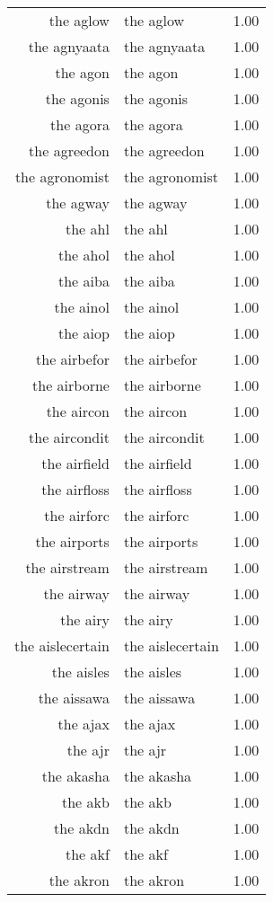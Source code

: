 \begin{table}[ht]
\begin{tabular}{rlr}
  the aglow & the aglow & 1.00 \\ 
  the agnyaata & the agnyaata & 1.00 \\ 
  the agon & the agon & 1.00 \\ 
  the agonis & the agonis & 1.00 \\ 
  the agora & the agora & 1.00 \\ 
  the agreedon & the agreedon & 1.00 \\ 
  the agronomist & the agronomist & 1.00 \\ 
  the agway & the agway & 1.00 \\ 
  the ahl & the ahl & 1.00 \\ 
  the ahol & the ahol & 1.00 \\ 
  the aiba & the aiba & 1.00 \\ 
  the ainol & the ainol & 1.00 \\ 
  the aiop & the aiop & 1.00 \\ 
  the airbefor & the airbefor & 1.00 \\ 
  the airborne & the airborne & 1.00 \\ 
  the aircon & the aircon & 1.00 \\ 
  the aircondit & the aircondit & 1.00 \\ 
  the airfield & the airfield & 1.00 \\ 
  the airfloss & the airfloss & 1.00 \\ 
  the airforc & the airforc & 1.00 \\ 
  the airports & the airports & 1.00 \\ 
  the airstream & the airstream & 1.00 \\ 
  the airway & the airway & 1.00 \\ 
  the airy & the airy & 1.00 \\ 
  the aislecertain & the aislecertain & 1.00 \\ 
  the aisles & the aisles & 1.00 \\ 
  the aissawa & the aissawa & 1.00 \\ 
  the ajax & the ajax & 1.00 \\ 
  the ajr & the ajr & 1.00 \\ 
  the akasha & the akasha & 1.00 \\ 
  the akb & the akb & 1.00 \\ 
  the akdn & the akdn & 1.00 \\ 
  the akf & the akf & 1.00 \\ 
  the akron & the akron & 1.00 \\ 

\end{tabular}
\end{table}

